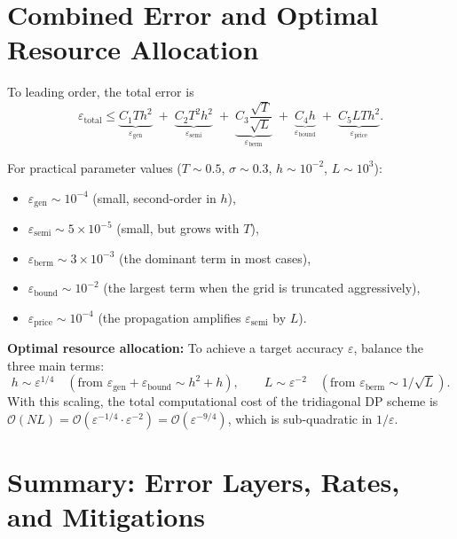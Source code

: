 \documentclass[11pt,a4paper,openany]{book}
\theoremstyle{definition}
\theoremstyle{plain}
\theoremstyle{remark}
\newcommand{\1}{\mathbbm{1}}
\begin{document}
\section{Combined Error and Optimal Resource Allocation}

To leading order, the total error is
\[
\boxed{\varepsilon_{\text{total}} \leq \underbrace{C_{1} T h^{2}}_{\varepsilon_{\text{gen}}} \;+\; \underbrace{C_{2} T^{2} h^{2}}_{\varepsilon_{\text{semi}}} \;+\; \underbrace{C_{3} \frac{\sqrt{T}}{\sqrt{L}}}_{\varepsilon_{\text{berm}}} \;+\; \underbrace{C_{4} h}_{\varepsilon_{\text{bound}}} \;+\; \underbrace{C_{5} L T h^{2}}_{\varepsilon_{\text{price}}}}.
\]

For practical parameter values ($T \sim 0.5$, $\sigma \sim 0.3$, $h \sim 10^{-2}$, $L \sim 10^{3}$):
\begin{itemize}
    \item $\varepsilon_{\text{gen}} \sim 10^{-4}$ (small, second-order in $h$),
    \item $\varepsilon_{\text{semi}} \sim 5 \times 10^{-5}$ (small, but grows with $T$),
    \item $\varepsilon_{\text{berm}} \sim 3 \times 10^{-3}$ (the dominant term in most cases),
    \item $\varepsilon_{\text{bound}} \sim 10^{-2}$ (the largest term when the grid is truncated aggressively),
    \item $\varepsilon_{\text{price}} \sim 10^{-4}$ (the propagation amplifies $\varepsilon_{\text{semi}}$ by $L$).
\end{itemize}

\textbf{Optimal resource allocation:} To achieve a target accuracy $\varepsilon$, balance the three main terms:
\[
h \sim \varepsilon^{1/4} \quad (\text{from } \varepsilon_{\text{gen}} + \varepsilon_{\text{bound}} \sim h^{2} + h), \qquad
L \sim \varepsilon^{-2} \quad (\text{from } \varepsilon_{\text{berm}} \sim 1/\sqrt{L}).
\]
With this scaling, the total computational cost of the tridiagonal DP scheme is $\mathcal{O}(N L) = \mathcal{O}(\varepsilon^{-1/4} \cdot \varepsilon^{-2}) = \mathcal{O}(\varepsilon^{-9/4})$, which is sub-quadratic in $1/\varepsilon$.

\section{Summary: Error Layers, Rates, and Mitigations}
\end{document}
